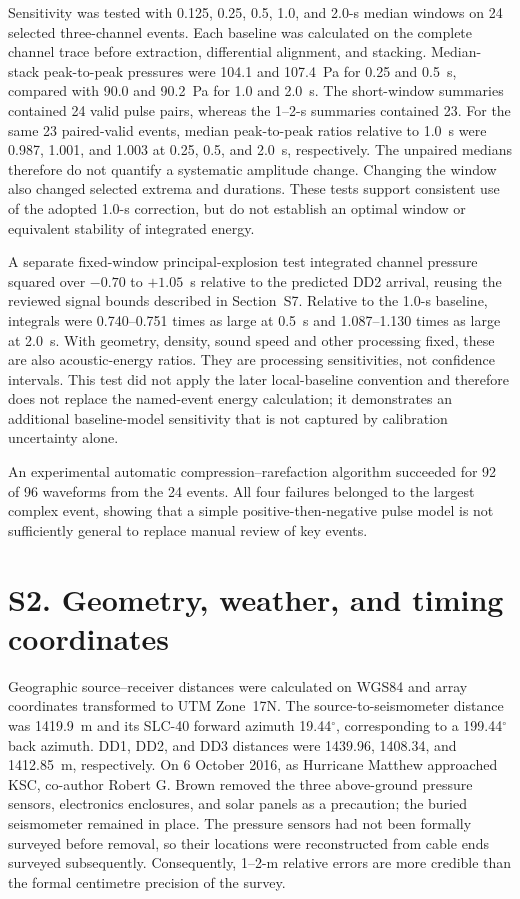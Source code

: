 \documentclass[]{seismica}
\begin{document}
Sensitivity was tested with 0.125, 0.25, 0.5, 1.0, and 2.0-s median windows on
24 selected three-channel events. Each baseline was calculated on the complete
channel trace before extraction, differential alignment, and stacking.
Median-stack peak-to-peak pressures were 104.1 and 107.4~Pa for 0.25 and
0.5~s, compared with 90.0 and 90.2~Pa for 1.0 and 2.0~s. The short-window
summaries contained 24 valid pulse pairs, whereas the 1--2-s summaries contained
23. For the same 23 paired-valid events, median peak-to-peak ratios relative
to 1.0~s were 0.987, 1.001, and 1.003 at 0.25, 0.5, and 2.0~s, respectively.
The unpaired medians therefore do not quantify a systematic amplitude change.
Changing the window
also changed selected extrema and durations. These tests support consistent
use of the adopted 1.0-s correction, but do not establish an optimal window
or equivalent stability of integrated energy.

A separate fixed-window principal-explosion test integrated channel pressure
squared over $-0.70$ to $+1.05$~s relative to the predicted DD2 arrival, reusing
the reviewed signal bounds described in Section~S7. Relative to the 1.0-s
baseline, integrals were 0.740--0.751 times as large at 0.5~s and
1.087--1.130 times as large at 2.0~s. With geometry, density, sound speed and
other processing fixed, these are also acoustic-energy ratios. They are
processing sensitivities, not confidence intervals. This test did not apply
the later local-baseline convention and therefore does not replace the
named-event energy calculation; it demonstrates an additional baseline-model
sensitivity that is not captured by calibration uncertainty alone.

An experimental automatic compression--rarefaction algorithm succeeded for
92 of 96 waveforms from the 24 events. All four failures belonged to the
largest complex event, showing that a simple positive-then-negative pulse model
is not sufficiently general to replace manual review of key events.

\FloatBarrier

\section*{S2. Geometry, weather, and timing coordinates}
\label{sec:supp_weather}

Geographic source--receiver distances were calculated on WGS84 and array
coordinates transformed to UTM Zone~17N. The source-to-seismometer distance
was 1419.9~m and its SLC-40 forward azimuth 19.44$^\circ$, corresponding to a
199.44$^\circ$ back azimuth. DD1, DD2, and DD3 distances were 1439.96,
1408.34, and 1412.85~m, respectively. On 6 October 2016, as Hurricane Matthew approached
KSC, co-author Robert G. Brown removed the three above-ground pressure sensors,
electronics enclosures, and solar panels as a precaution; the buried
seismometer remained in place. The pressure sensors had not been formally
surveyed before removal, so their locations were reconstructed from cable ends
surveyed subsequently. Consequently, 1--2-m relative errors are more credible
than the formal centimetre precision of the survey.
\end{document}
